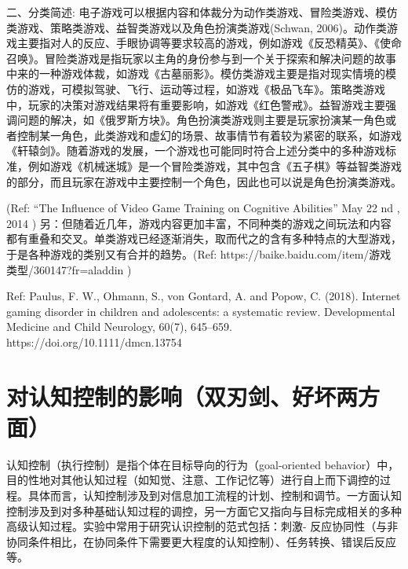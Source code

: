 二、分类简述:
  电子游戏可以根据内容和体裁分为动作类游戏、冒险类游戏、模仿类游戏、策略类游戏、益智类游戏以及角色扮演类游戏(Schwan, 2006)。动作类游戏主要指对人的反应、手眼协调等要求较高的游戏，例如游戏《反恐精英》、《使命召唤》。冒险类游戏是指玩家以主角的身份参与到一个关于探索和解决问题的故事中来的一种游戏体裁，如游戏《古墓丽影》。模仿类游戏主要是指对现实情境的模仿的游戏，可模拟驾驶、飞行、运动等过程，如游戏《极品飞车》。策略类游戏中，玩家的决策对游戏结果将有重要影响，如游戏《红色警戒》。益智游戏主要强调问题的解决，如《俄罗斯方块》。角色扮演类游戏则主要是玩家扮演某一角色或者控制某一角色，此类游戏和虚幻的场景、故事情节有着较为紧密的联系，如游戏《轩辕剑》。随着游戏的发展，一个游戏也可能同时符合上述分类中的多种游戏标准，例如游戏《机械迷城》是一个冒险类游戏，其中包含《五子棋》等益智类游戏的部分，而且玩家在游戏中主要控制一个角色，因此也可以说是角色扮演类游戏。

         (Ref:      “The Influence of Video Game Training on Cognitive Abilities” May 22 nd , 2014 \cite{})
另：但随着近几年，游戏内容更加丰富，不同种类的游戏之间玩法和内容都有重叠和交叉。单类游戏已经逐渐消失，取而代之的含有多种特点的大型游戏，于是各种游戏的类别又有合并的趋势。(Ref: https://baike.baidu.com/item/游戏类型/360147?fr=aladdin \cite{})

Ref: Paulus, F. W., Ohmann, S., von Gontard, A. and  Popow, C. (2018). Internet gaming disorder in children and adolescents: a systematic review. Developmental Medicine and Child Neurology, 60(7), 645–659. https://doi.org/10.1111/dmcn.13754


\section{对认知控制的影响（双刃剑、好坏两方面） }




 认知控制（执行控制）是指个体在目标导向的行为（goal-oriented behavior）中，目的性地对其他认知过程（如知觉、注意、工作记忆等）进行自上而下调控的过程。具体而言，认知控制涉及到对信息加工流程的计划、控制和调节。一方面认知控制涉及到对多种基础认知过程的调控，另一方面它又指向与目标完成相关的多种高级认知过程。实验中常用于研究认识控制的范式包括：刺激- 反应协同性（与非协同条件相比，在协同条件下需要更大程度的认知控制）、任务转换、错误后反应等。

